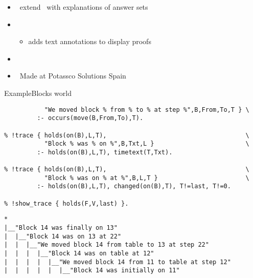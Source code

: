 \begin{frame}{\xclingo}
  \begin{itemize}
  \item {} \ extend \clingo\ with explanations of answer sets
  \item {} \
    \begin{itemize}
    \item adds text annotations to display proofs
    \end{itemize}
  \item {} \ \cite{cafabr20a}
  \item {} \ Made at Potassco Solutions Spain
  \end{itemize}
\end{frame}
\begin{frame}[fragile,shrink]{Example}{Blocks world}
\begin{lstlisting}[language=clingo,commentstyle={\color{white}},basicstyle=\scriptsize\ttfamily]
% !trace { occurs(move(B,From,To),T),                             \
           "We moved block % from % to % at step %",B,From,To,T } \
         :- occurs(move(B,From,To),T).

% !trace { holds(on(B),L,T),                                      \
           "Block % was % on %",B,Txt,L }                         \
         :- holds(on(B),L,T), timetext(T,Txt).

% !trace { holds(on(B),L,T),                                      \
           "Block % was on % at %",B,L,T }                        \
         :- holds(on(B),L,T), changed(on(B),T), T!=last, T!=0.

% !show_trace { holds(F,V,last) }.
\end{lstlisting}
\pause
\begin{lstlisting}[language=clingo,basicstyle=\scriptsize\ttfamily]
*
|__"Block 14 was finally on 13"
|  |__"Block 14 was on 13 at 22"
|  |  |__"We moved block 14 from table to 13 at step 22"
|  |  |  |__"Block 14 was on table at 12"
|  |  |  |  |__"We moved block 14 from 11 to table at step 12"
|  |  |  |  |  |__"Block 14 was initially on 11"
\end{lstlisting}
\end{frame}
%
